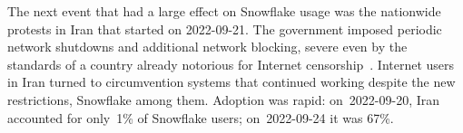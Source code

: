 \documentclass[letterpaper,twocolumn]{article}
\begin{document}
The next event that had a large effect on Snowflake usage
was the nationwide protests in Iran that started on \mbox{2022-09-21}.
The government imposed periodic network shutdowns
and additional network blocking,
severe even by the standards of a country already notorious
for Internet censorship~\cite{ooni-2022-iran-blocks-social-media-mahsa-amini-protests}.
Internet users in Iran turned to circumvention systems
that continued working despite the new restrictions,
Snowflake among them.
Adoption was rapid:
on~\mbox{2022-09-20}, Iran accounted for only~1\% of Snowflake users;
on~\mbox{2022-09-24} it was 67\%.
\end{document}
